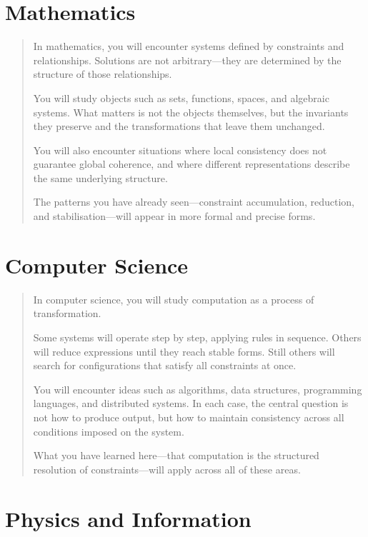 \documentclass[11pt]{book}
\theoremstyle{plain}
\theoremstyle{definition}
\theoremstyle{remark}
\begin{document}
\section*{Mathematics}

\begin{quote}
In mathematics, you will encounter systems defined by constraints and
relationships. Solutions are not arbitrary---they are determined by the
structure of those relationships.

You will study objects such as sets, functions, spaces, and algebraic
systems. What matters is not the objects themselves, but the invariants
they preserve and the transformations that leave them unchanged.

You will also encounter situations where local consistency does not
guarantee global coherence, and where different representations describe
the same underlying structure.

The patterns you have already seen---constraint accumulation, reduction,
and stabilisation---will appear in more formal and precise forms.
\end{quote}

\section*{Computer Science}

\begin{quote}
In computer science, you will study computation as a process of
transformation.

Some systems will operate step by step, applying rules in sequence.
Others will reduce expressions until they reach stable forms. Still
others will search for configurations that satisfy all constraints at
once.

You will encounter ideas such as algorithms, data structures,
programming languages, and distributed systems. In each case, the
central question is not how to produce output, but how to maintain
consistency across all conditions imposed on the system.

What you have learned here---that computation is the structured
resolution of constraints---will apply across all of these areas.
\end{quote}

\section*{Physics and Information}
\end{document}
